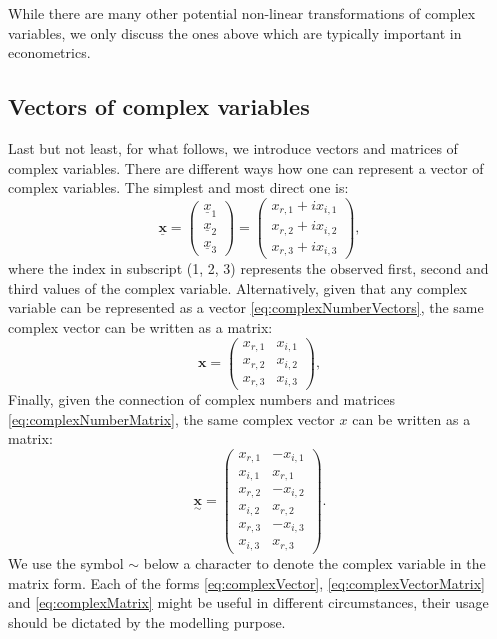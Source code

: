 \documentclass[
]{book}
\begin{document}
While there are many other potential non-linear transformations of complex variables, we only discuss the ones above which are typically important in econometrics.

\hypertarget{vectorComplexVariables}{%
\subsection{Vectors of complex variables}\label{vectorComplexVariables}}

Last but not least, for what follows, we introduce vectors and matrices of complex variables. There are different ways how one can represent a vector of complex variables. The simplest and most direct one is:
\begin{equation}
    \underline{\mathbf{x}} = \begin{pmatrix} \underline{x}_1 \\ \underline{x}_2 \\ \underline{x}_3 \end{pmatrix} = \begin{pmatrix} x_{r,1} + i x_{i,1} \\ x_{r,2} + i x_{i,2} \\ x_{r,3} + i x_{i,3} \end{pmatrix} ,
    \label{eq:complexVector}
\end{equation}
where the index in subscript (1, 2, 3) represents the observed first, second and third values of the complex variable. Alternatively, given that any complex variable can be represented as a vector \eqref{eq:complexNumberVectors}, the same complex vector can be written as a matrix:
\begin{equation}
    \mathbf{x} = \begin{pmatrix} x_{r,1} & x_{i,1} \\ x_{r,2} & x_{i,2} \\ x_{r,3} & x_{i,3} \end{pmatrix} ,
    \label{eq:complexVectorMatrix}
\end{equation}
Finally, given the connection of complex numbers and matrices \eqref{eq:complexNumberMatrix}, the same complex vector \(x\) can be written as a matrix:
\begin{equation}
    \underset{\sim}{\mathbf{x}} = \begin{pmatrix} x_{r,1} & - x_{i,1} \\ x_{i,1} & x_{r,1} \\
                                 x_{r,2} & - x_{i,2} \\ x_{i,2} & x_{r,2} \\
                                 x_{r,3} & - x_{i,3} \\ x_{i,3} & x_{r,3} \end{pmatrix} .
    \label{eq:complexMatrix}
\end{equation}
We use the symbol \(\sim\) below a character to denote the complex variable in the matrix form. Each of the forms \eqref{eq:complexVector}, \eqref{eq:complexVectorMatrix} and \eqref{eq:complexMatrix} might be useful in different circumstances, their usage should be dictated by the modelling purpose.
\end{document}
